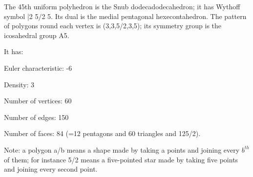 The 45th uniform polyhedron is the Snub dodecadodecahedron; it has Wythoff symbol |2 5/2 5. Its dual is the medial pentagonal hexecontahedron. The pattern of polygons round each vertex is (3,3,5/2,3,5); its symmetry group is the icosahedral group A5.\par
It has:\par
Euler characteristic: -6\par
Density: 3\par
Number of vertices: 60\par
Number of edges:  150\par
Number of faces: 84 (=12 pentagons and 60 triangles and 12{5/2}).\par
Note: a polygon a/b means a shape made by taking a points and joining every $b^{th}$  of them; for instance 5/2 means a five-pointed star made by taking five points and joining every second point.